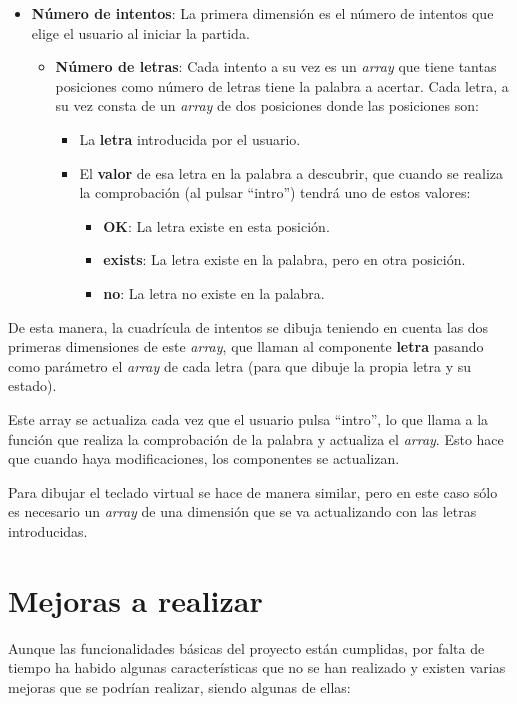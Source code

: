 \documentclass{\ClassPath/viu-tfm-template}
\begin{document}
\vspace{-1em}
\begin{itemize}
    \item \textbf{Número de intentos}: La primera dimensión es el número de intentos que elige el usuario al iniciar la partida.
    \begin{itemize}
        \item \textbf{Número de letras}: Cada intento a su vez es un \textit{array} que tiene tantas posiciones como número de letras tiene la palabra a acertar. Cada letra, a su vez consta de un \textit{array} de dos posiciones donde las posiciones son:
        \begin{itemize}
            \item La \textbf{letra} introducida por el usuario.
            \item El \textbf{valor} de esa letra en la palabra a descubrir, que cuando se realiza la comprobación (al pulsar “intro”) tendrá uno de estos valores:
            \begin{itemize}
                \item \textbf{OK}: La letra existe en esta posición.
                \item \textbf{exists}: La letra existe en la palabra, pero en otra posición.
                \item \textbf{no}: La letra no existe en la palabra.
            \end{itemize}
        \end{itemize}
    \end{itemize}
\end{itemize}
\vspace{-1em}

De esta manera, la cuadrícula de intentos se dibuja teniendo en cuenta las dos primeras dimensiones de este \textit{array}, que llaman al componente \textbf{letra} pasando como parámetro el \textit{array} de cada letra (para que dibuje la propia letra y su estado).

Este array se actualiza cada vez que el usuario pulsa “intro”, lo que llama a la función  que realiza la comprobación de la palabra y actualiza el \textit{array}. Esto hace que cuando haya modificaciones, los componentes se actualizan.

Para dibujar el teclado virtual se hace de manera similar, pero en este caso sólo es necesario un \textit{array} de una dimensión que se va actualizando con las letras introducidas.


\chapter{Mejoras a realizar}
Aunque las funcionalidades básicas del proyecto están cumplidas, por falta de tiempo ha habido algunas características que no se han realizado y existen varias mejoras que se podrían realizar, siendo algunas de ellas:
\end{document}
